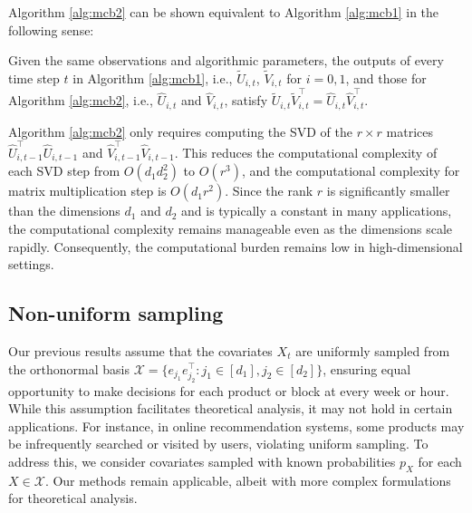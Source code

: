 \documentclass[12pt]{article}
\theoremstyle{plain}
\begin{document}
Algorithm \ref{alg:mcb2} can be shown equivalent to Algorithm \ref{alg:mcb1} in the following sense:
\begin{lem}
    Given the same observations and algorithmic parameters, the outputs of every time step $t$ in Algorithm \ref{alg:mcb1}, i.e., $\widetilde{U}_{i,t}$, $\widetilde{V}_{i,t}$ for $i=0,1$, and those for Algorithm \ref{alg:mcb2}, i.e., $\widehat{U}_{i,t}$ and $\widehat{V}_{i,t}$, satisfy $\widetilde{U}_{i,t}\widetilde{V}_{i,t}^{\top}=\widehat{U}_{i,t}\widehat{V}_{i,t}^{\top}$.
\end{lem}

Algorithm \ref{alg:mcb2} only requires computing the SVD of the $r\times r$ matrices $\widehat{U}_{i,t-1}^{\top}\widehat{U}_{i,t-1}$ and $\widehat{V}_{i,t-1}^{\top}\widehat{V}_{i,t-1}$. This reduces the computational complexity of each SVD step from $O(d_1d_2^2)$ to $O(r^3)$, and the computational complexity for matrix multiplication step is $O(d_1r^2)$. Since the rank $r$ is significantly smaller than the dimensions $d_1$ and $d_2$ and is typically a constant in many applications, the computational complexity remains manageable even as the dimensions scale rapidly. Consequently, the computational burden remains low in high-dimensional settings.


\subsection{Non-uniform sampling} \label{non-uniform}
Our previous results assume that the covariates $X_t$ are uniformly sampled from the orthonormal basis $\mathcal{X}=\{e_{j_1}e_{j_2}^{\top}: j_1\in [d_1],j_2\in[d_2] \}$, ensuring equal opportunity to make decisions for each product or block at every week or hour. While this assumption facilitates theoretical analysis, it may not hold in certain applications. For instance, in online recommendation systems, some products may be infrequently searched or visited by users, violating uniform sampling. To address this, we consider covariates sampled with known probabilities $p_{X}$ for each $X\in \mathcal{X}$. Our methods remain applicable, albeit with more complex formulations for theoretical analysis.
\end{document}
